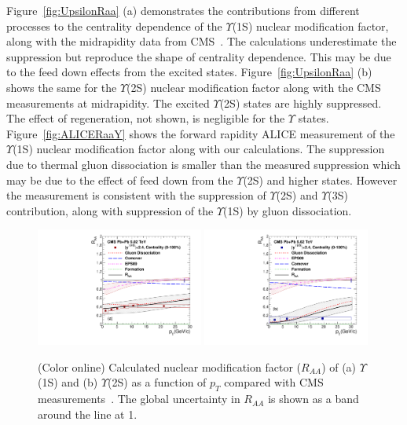 {Figure~\ref{fig:UpsilonRaa} (a) demonstrates the contributions from different processes to the 
centrality dependence of the $\Upsilon$(1S) nuclear modification factor, along with the midrapidity 
data from CMS~\cite{Chatrchyan:2012lxa}. The calculations underestimate the suppression but reproduce 
the shape of centrality dependence. This may be due to the feed down effects from the excited states. 
Figure~\ref{fig:UpsilonRaa} (b) shows the same for the $\Upsilon$(2S) nuclear modification factor
along with the CMS measurements at midrapidity. The excited $\Upsilon$(2S) states 
are highly suppressed. The effect of regeneration, not shown, is negligible 
for the $\Upsilon$ states. 
{\color{black} Figure~\ref{fig:ALICERaaY} shows the forward rapidity 
  ALICE measurement of the $\Upsilon$(1S) nuclear modification factor \cite{Abelev:2014nua}
  along with our calculations. The suppression due to thermal gluon dissociation is smaller 
  than the measured suppression which may be due to the effect of feed down from the $\Upsilon$(2S)
  and higher states.} 
{\color{black} However the measurement is consistent with the suppression of $\Upsilon$(2S) and  
  $\Upsilon$(3S) contribution, along with suppression of the $\Upsilon$(1S) by gluon 
  dissociation.
}


\begin{figure}
\includegraphics[width=0.49\textwidth]{Figures/Quarkonia_502TeV/Fig7a_Y1S_CMS_RAAPt_Shade.pdf}
\includegraphics[width=0.49\textwidth]{Figures/Quarkonia_502TeV/Fig7b_Y2S_CMS_RAAPt_Shade.pdf}
\caption{(Color online) Calculated nuclear modification factor ($R_{AA}$) of (a) $\Upsilon$(1S) and 
  (b) $\Upsilon$(2S) as a function of $p_{T}$ 
  compared with CMS measurements~\cite{Sirunyan:2018nsz}.
The global uncertainty in $R_{AA}$ is shown as a band around the line at 1.
}
\label{fig:UpsilonRaaPtCMS}
\end{figure}



}
